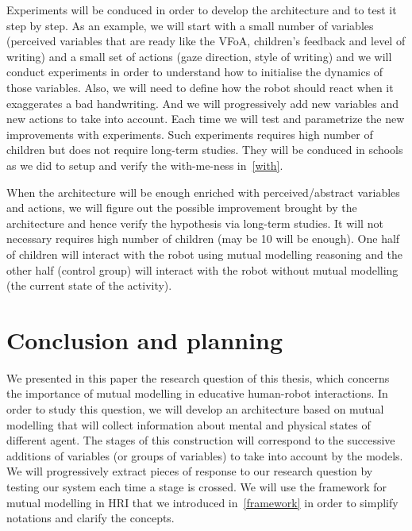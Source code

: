 \documentclass[10pt,a4paper]{article}
\begin{document}
Experiments will be conduced in order to develop the architecture and to test it step by step. 
As an example, we will start with a small number of variables (perceived variables that are ready like the VFoA, children's feedback and level of writing) and a small set of actions (gaze direction, style of writing) and we will conduct experiments in order to understand how to initialise the dynamics of those variables. 
Also, we will need to define how the robot should react when it exaggerates a bad handwriting. And we will progressively add new variables  and new actions to take into account. 
Each time we will test and parametrize the new improvements with experiments. Such experiments requires high number of children but does not require long-term studies. They will be conduced in schools as we did to setup and verify the with-me-ness in~\ref{with}.

When the architecture will be enough enriched with perceived/abstract variables and actions, we will figure out the possible improvement brought by the architecture and hence verify the hypothesis via long-term studies. It will not necessary requires high number of children (may be 10 will be enough). One half of children will interact with the robot using mutual modelling reasoning and the other half (control group) will interact with the robot without mutual modelling (the current state of the activity). %

\section{Conclusion and planning}

We presented in this paper the research question of this thesis, which concerns the importance of mutual modelling in educative human-robot interactions. In order to study this question, we will develop an architecture based on mutual modelling that will collect information about mental and physical states of different agent. The stages of this construction will correspond to the successive additions of variables (or groups of variables) to take into account by the models. We will progressively extract pieces of response to our research question by testing our system each time a stage is crossed. We will use the framework for mutual modelling in HRI that we introduced in~\ref{framework} in order to simplify notations and clarify the concepts. 
\end{document}

